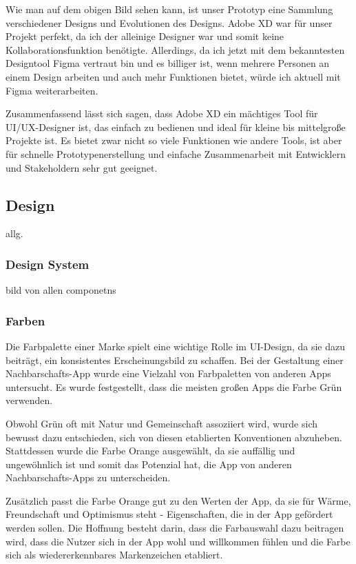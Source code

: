 Wie man auf dem obigen Bild sehen kann, ist unser Prototyp
eine Sammlung verschiedener Designs und Evolutionen des
Designs. Adobe XD war für unser Projekt perfekt, da ich der
alleinige Designer war und somit keine
Kollaborationsfunktion benötigte. Allerdings, da ich jetzt
mit dem bekanntesten Designtool Figma vertraut bin und es billiger ist, wenn mehrere
Personen an einem Design arbeiten und auch mehr Funktionen
bietet, würde ich aktuell mit Figma weiterarbeiten.

Zusammenfassend lässt sich sagen, dass Adobe XD ein mächtiges Tool für UI/UX-Designer ist, das einfach zu bedienen und ideal für kleine bis mittelgroße Projekte ist. Es bietet zwar nicht so viele Funktionen wie andere Tools, ist aber für schnelle Prototypenerstellung und einfache Zusammenarbeit mit Entwicklern und Stakeholdern sehr gut geeignet.

\subsection{Design}
allg.

\subsubsection{Design System}
bild von allen componetns

\subsubsection{Farben}
Die Farbpalette einer Marke spielt eine wichtige Rolle im UI-Design, da sie dazu beiträgt, ein konsistentes Erscheinungsbild zu schaffen. Bei der Gestaltung einer Nachbarschafts-App wurde eine Vielzahl von Farbpaletten von anderen Apps untersucht. Es wurde festgestellt, dass die meisten großen Apps die Farbe Grün verwenden.

Obwohl Grün oft mit Natur und Gemeinschaft assoziiert wird, wurde sich bewusst dazu entschieden, sich von diesen etablierten Konventionen abzuheben. Stattdessen wurde die Farbe Orange ausgewählt, da sie auffällig und ungewöhnlich ist und somit das Potenzial hat, die App von anderen Nachbarschafts-Apps zu unterscheiden.

Zusätzlich passt die Farbe Orange gut zu den Werten der App, da sie für Wärme, Freundschaft und Optimismus steht - Eigenschaften, die in der App gefördert werden sollen. Die Hoffnung besteht darin, dass die Farbauswahl dazu beitragen wird, dass die Nutzer sich in der App wohl und willkommen fühlen und die Farbe sich als wiedererkennbares Markenzeichen etabliert.


